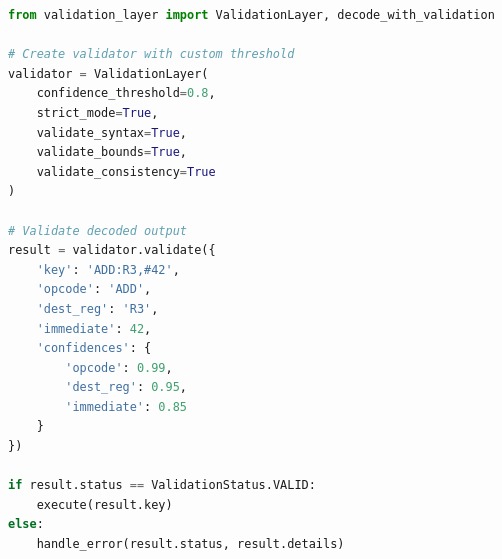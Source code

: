 \documentclass[11pt]{article}
\begin{document}
\begin{lstlisting}[language=Python]
from validation_layer import ValidationLayer, decode_with_validation

# Create validator with custom threshold
validator = ValidationLayer(
    confidence_threshold=0.8,
    strict_mode=True,
    validate_syntax=True,
    validate_bounds=True,
    validate_consistency=True
)

# Validate decoded output
result = validator.validate({
    'key': 'ADD:R3,#42',
    'opcode': 'ADD',
    'dest_reg': 'R3',
    'immediate': 42,
    'confidences': {
        'opcode': 0.99,
        'dest_reg': 0.95,
        'immediate': 0.85
    }
})

if result.status == ValidationStatus.VALID:
    execute(result.key)
else:
    handle_error(result.status, result.details)
\end{lstlisting}
\end{document}
